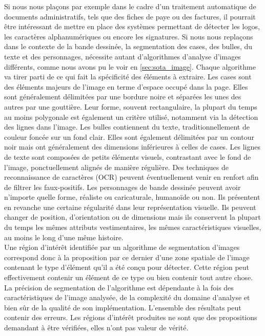Si nous nous plaçons par exemple dans le cadre d'un traitement automatique de documents administratifs, tels que des fiches de paye ou des factures, il pourrait être intéressant de mettre en place des systèmes permettant de détecter les logos, les caractères alphanumériques ou encore les signatures.
Si nous nous replaçons dans le contexte de la bande dessinée, la segmentation des cases, des bulles, du texte et des personnages, nécessite autant d'algorithmes d'analyse d'images différents, comme nous avons pu le voir en \ref{sec:sota_image}.
Chaque algorithme va tirer parti de ce qui fait la spécificité des éléments à extraire.
Les cases sont des éléments majeurs de l'image en terme d'espace occupé dans la page. 
Elles sont généralement délimitées par une bordure noire et séparées les unes des autres par une gouttière.
Leur forme, souvent rectangulaire, la plupart du temps au moins polygonale est également un critère utilisé, notamment via la détection des lignes dans l'image.
Les bulles contiennent du texte, traditionnellement de couleur foncée sur un fond clair.
Elles sont également délimitées par un contour noir mais ont généralement des dimensions inférieures à celles de cases.
Les lignes de texte sont composées de petits éléments visuels, contrastant avec le fond de l'image, ponctuellement alignés de manière régulière.
Des techniques de reconnaissance de caractères (OCR) peuvent éventuellement venir en renfort afin de filtrer les faux-positifs.
Les personnages de bande dessinée peuvent avoir n'importe quelle forme, réaliste ou caricaturale, humanoïde ou non.
Ils présentent en revanche une certaine régularité dans leur représentation visuelle.
Ils peuvent changer de position, d'orientation ou de dimensions mais ils conservent la plupart du temps les mêmes attributs vestimentaires, les mêmes caractéristiques visuelles, au moins le long d'une même histoire.\\


Une région d'intérêt identifiée par un algorithme de segmentation d'images correspond donc à la proposition par ce dernier d'une zone spatiale de l'image contenant le type d'élément qu'il a été conçu pour détecter.
Cette région peut effectivement contenir un élément de ce type ou bien contenir tout autre chose.
La précision de segmentation de l'algorithme est dépendante à la fois des caractéristiques de l'image analysée, de la complexité du domaine d'analyse et bien sûr de la qualité de son implémentation.
L'ensemble des résultats peut contenir des erreurs.
Les régions d'intérêt produites ne sont que des propositions demandant à être vérifiées, elles n'ont pas valeur de vérité.\\

